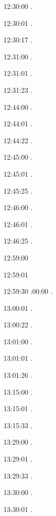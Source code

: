 \documentclass[italian]{article}
\begin{document}
12:30:00    .

12:30:01    .

12:30:17    .

12:31:00    .

12:31:01    .

12:31:23    .

12:44:00    .

12:44:01    .

12:44:22    .

12:45:00    .

12:45:01    .

12:45:25    .

12:46:00    .

12:46:01    .

12:46:25    .

12:59:00    

12:59:01    

12:59:30    
:00:00    . 

13:00:01    . 

13:00:22    . 

13:01:00     . 

13:01:01     . 

13:01:26     . 

13:15:00     . 

13:15:01     .

13:15:33     .

13:29:00     . 

13:29:01     . 

13:29:33     . 

13:30:00     .

13:30:01     .
\end{document}
